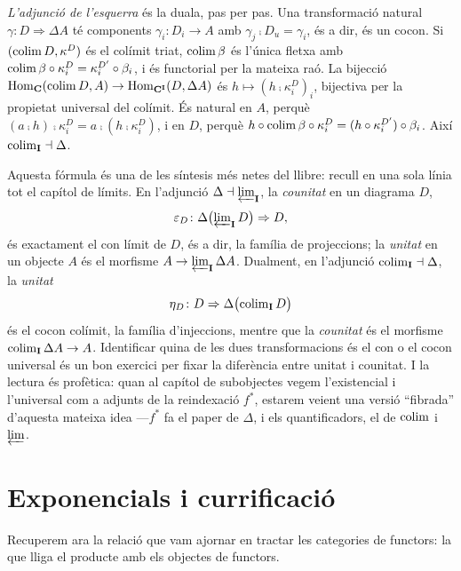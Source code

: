 \begin{prova}
\emph{L'adjunció de l'esquerra} és la duala, pas per pas. Una transformació natural $\gamma\colon D\Rightarrow\Delta A$ té components $\gamma_i\colon D_i\to A$ amb $\gamma_j\comp D_u=\gamma_i$, és a dir, és un cocon. Si $(\operatorname*{colim} D,\kappa^D)$ és el colímit triat, $\operatorname*{colim}\beta$ és l'única fletxa amb $\operatorname*{colim}\beta\circ\kappa^D_i=\kappa^{D'}_i\circ\beta_i$, i és functorial per la mateixa raó. La bijecció $\operatorname{Hom}_{\mathbf{C}}(\operatorname*{colim} D,A)\to\operatorname{Hom}_{\mathbf{C}^{\mathbf{I}}}(D,\Delta A)$ és $h\mapsto(h\comp\kappa^D_i)_i$, bijectiva per la propietat universal del colímit. És natural en $A$, perquè $(a\comp h)\comp\kappa^D_i=a\comp(h\comp\kappa^D_i)$, i en $D$, perquè $h\circ\operatorname*{colim}\beta\circ\kappa^D_i=(h\circ\kappa^{D'}_i)\circ\beta_i$. Així $\operatorname*{colim}_{\mathbf{I}}\dashv\Delta$.
\end{prova}

\begin{observacio}
Aquesta fórmula és una de les síntesis més netes del llibre: recull en una sola línia tot el capítol de límits. En l'adjunció $\Delta\dashv\varprojlim_{\mathbf{I}}$, la \emph{counitat} en un diagrama $D$,
\[
\varepsilon_D\colon\Delta\bigl(\varprojlim\nolimits_{\mathbf{I}}D\bigr)\Rightarrow D,
\]
és exactament el con límit de $D$, és a dir, la família de projeccions; la \emph{unitat} en un objecte $A$ és el morfisme $A\to\varprojlim_{\mathbf{I}}\Delta A$. Dualment, en l'adjunció $\operatorname*{colim}_{\mathbf{I}}\dashv\Delta$, la \emph{unitat}
\[
\eta_D\colon D\Rightarrow\Delta\bigl(\operatorname*{colim}\nolimits_{\mathbf{I}}D\bigr)
\]
és el cocon colímit, la família d'injeccions, mentre que la \emph{counitat} és el morfisme $\operatorname*{colim}_{\mathbf{I}}\Delta A\to A$. Identificar quina de les dues transformacions és el con o el cocon universal és un bon exercici per fixar la diferència entre unitat i counitat. I la lectura és profètica: quan al capítol de subobjectes vegem l'existencial i l'universal com a adjunts de la reindexació $f^{*}$, estarem veient una versió \enquote{fibrada} d'aquesta mateixa idea ---$f^{*}$ fa el paper de $\Delta$, i els quantificadors, el de $\operatorname*{colim}$ i $\varprojlim$.
\end{observacio}

\section{Exponencials i currificació}

Recuperem ara la relació que vam ajornar en tractar les categories de functors: la que lliga el producte amb els objectes de functors.

